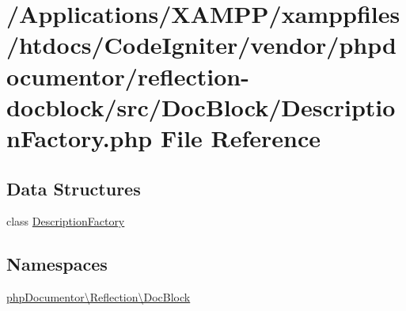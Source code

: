 \hypertarget{_description_factory_8php}{}\section{/\+Applications/\+X\+A\+M\+P\+P/xamppfiles/htdocs/\+Code\+Igniter/vendor/phpdocumentor/reflection-\/docblock/src/\+Doc\+Block/\+Description\+Factory.php File Reference}
\label{_description_factory_8php}
\subsection*{Data Structures}
\begin{DoxyCompactItemize}
\item 
class \mbox{\hyperlink{classphp_documentor_1_1_reflection_1_1_doc_block_1_1_description_factory}{Description\+Factory}}
\end{DoxyCompactItemize}
\subsection*{Namespaces}
\begin{DoxyCompactItemize}
\item 
 \mbox{\hyperlink{namespacephp_documentor_1_1_reflection_1_1_doc_block}{php\+Documentor\textbackslash{}\+Reflection\textbackslash{}\+Doc\+Block}}
\end{DoxyCompactItemize}
